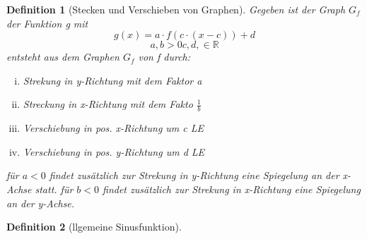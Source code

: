 \documentclass{book}
\newtheorem{definition}{Definition}
\begin{document}
\begin{definition}[Stecken und Verschieben von Graphen]

    Gegeben ist der Graph $G_f$ der Funktion g mit 
    \[
        g(x) = a \cdot f(c\cdot (x-c)) +d
    \]
    \[ a, b > 0 c, d, \in \mathbb{R}\]
    entsteht aus dem Graphen $G_f$ von f durch:
    \begin{enumerate}[i)]
        \item Strekung in y-Richtung mit dem Faktor a
        \item Streckung in x-Richtung mit dem Fakto $\frac 1b$
        \item Verschiebung in pos. x-Richtung um c LE 
        \item Verschiebung in pos. y-Richtung um d LE 
    \end{enumerate}

    für $ a<0$ findet zusätzlich zur Strekung in y-Richtung eine Spiegelung an der x-Achse statt.
    für $b<0$ findet zusätzlich zur Strekung in x-Richtung eine Spiegelung an der y-Achse.
    
\end{definition}

\begin{definition}[llgemeine Sinusfunktion]
    
\end{definition}
\end{document}
